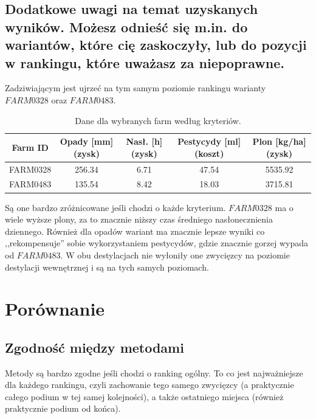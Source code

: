 \documentclass[11pt]{article}
\begin{document}
\subsection{Dodatkowe uwagi na temat uzyskanych wyników. Możesz odnieść się m.in. do wariantów, które cię zaskoczyły, lub do pozycji w rankingu, które uważasz za niepoprawne.}
Zadziwiającym jest ujrzeć na tym samym poziomie rankingu warianty $FARM0328$ oraz $FARM0483$.
\begin{table}[H]
\centering
\begin{tabular}{|c||c|c|c|c|}
\hline
\textbf{Farm ID} & \textbf{Opady [mm] (zysk)} & \textbf{Nasł. [h] (zysk)} & \textbf{Pestycydy [ml] (koszt)} & \textbf{Plon [kg/ha] (zysk)} \\
\hline
FARM0328 & 256.34 & 6.71 & 47.54 & 5535.92 \\
\hline
FARM0483 & 135.54 & 8.42 & 18.03 & 3715.81 \\
\hline
\end{tabular}
\caption{Dane dla wybranych farm według kryteriów.}
\end{table}
Są one bardzo zróżnicowane jeśli chodzi o każde kryterium. $FARM0328$ ma o wiele wyższe plony, za to znacznie niższy czas średniego nasłonecznienia dziennego. Również dla opadów wariant ma znacznie lepsze wyniki co ,,rekompensuje'' sobie wykorzystaniem pestycydów, gdzie znacznie gorzej wypada od $FARM0483$. W obu destylacjach nie wyłoniły one zwycięzcy na poziomie destylacji wewnętrznej i są na tych samych poziomach.

\section{Porównanie}
\subsection{Zgodność między metodami}
Metody są bardzo zgodne jeśli chodzi o ranking ogólny. To co jest najważniejsze dla każdego rankingu, czyli zachowanie tego samego zwycięzcy (a praktycznie całego podium w tej samej kolejności), a także ostatniego miejsca (również praktycznie podium od końca).
\end{document}
